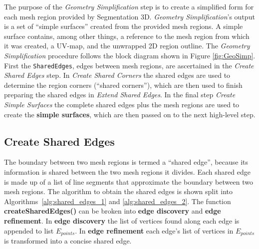 The purpose of the \textit{Geometry Simplification} step is to create a simplified form for each mesh region provided by Segmentation 3D.
\textit{Geometry Simplification}'s output is a set of ``simple surfaces'' created from the provided mesh regions.
A simple surface contains, among other things, a reference to the mesh region from which it was created, a UV-map, and the unwrapped 2D region outline.
The \textit{Geometry Simplification} procedure follows the block diagram shown in Figure \ref{fig:GeoSimp}.
First the \verb|SharedEdges|, edges between mesh regions, are ascertained in the \textit{Create Shared Edges} step.
In \textit{Create Shared Corners} the shared edges are used to determine the region corners (``shared corners''), which are then used to finish preparing the shared edges in \textit{Extend Shared Edges}.
In the final step \textit{Create Simple Surfaces} the complete shared edges plus the mesh regions are used to create the \textbf{simple surfaces}, which are then passed on to the next high-level step.

\subsection{Create Shared Edges}
The boundary between two mesh regions is termed a ``shared edge'', because its information is shared between the two mesh regions it divides.
Each shared edge is made up of a list of line segments that approximate the boundary between two mesh regions.
The algorithm to obtain the shared edges is shown split into Algorithms~\ref{alg:shared_edges_1} and \ref{alg:shared_edges_2}.
The function \textbf{createSharedEdges()} can be broken into \textbf{edge discovery} and \textbf{edge refinement}.
In \textbf{edge discovery} the list of vertices found along each edge is appended to list $E_{points}$.
In \textbf{edge refinement} each edge's list of vertices in $E_{points}$ is transformed into a concise shared edge.

